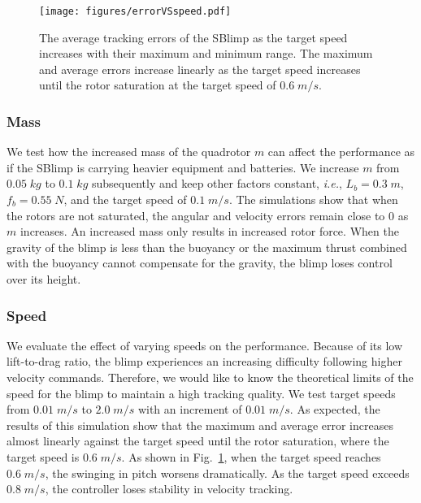 \documentclass[conference]{ieeeconf}
\begin{document}
\begin{figure}[t]
    \centering
    \texttt{[image: figures/errorVSspeed.pdf]}
    \caption{The average tracking errors of the SBlimp as the target speed increases with their maximum and minimum range. The maximum and average errors increase linearly as the target speed increases until the rotor saturation at the target speed of $0.6\; m/s$.}
    \vspace{-1em}
    \label{fig:simspeed}
\end{figure}

\subsubsection{Mass} We test how the increased mass of the quadrotor $m$ can affect the performance as if the SBlimp is carrying heavier equipment and batteries. We increase $m$ from $0.05\; kg$ to $0.1\; kg$ subsequently and keep other factors constant, \textit{i.e.}, $L_b = 0.3\; m$, $f_b = 0.55\; N$, and the target speed of $0.1\; m/s$. The simulations show that when the rotors are not saturated, the angular and velocity errors remain close to $0$ as $m$ increases. An increased mass only results in increased rotor force. When the gravity of the blimp is less than the buoyancy or the maximum thrust combined with the buoyancy cannot compensate for the gravity, the blimp loses control over its height.


\subsubsection{Speed} We evaluate the effect of varying speeds on the performance. Because of its low lift-to-drag ratio, the blimp experiences an increasing difficulty following higher velocity commands. 
Therefore, we would like to know the theoretical limits of the speed for the blimp to maintain a high tracking quality.
We test target speeds from $0.01\; m/s$ to $2.0\; m/s$ with an increment of $0.01\; m/s$. As expected, the results of this simulation show that the maximum and average error increases almost linearly against the target speed until the rotor saturation, where the target speed is $0.6\; m/s$. As shown in Fig.~\ref{fig:simspeed}, when the target speed reaches $0.6\; m/s$, the swinging in pitch worsens dramatically. As the target speed exceeds $0.8\; m/s$, the controller loses stability in velocity tracking.
\end{document}
